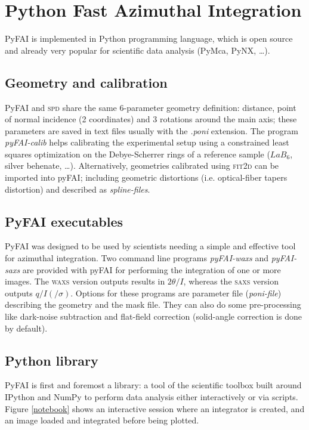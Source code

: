 \documentclass[a4paper]{jpconf}
\begin{document}
\section{Python Fast Azimuthal Integration}
PyFAI is implemented in Python programming language, which is open
source and already very popular for scientific data analysis (PyMca\cite{pymca},
PyNX\cite{pynx}, \ldots). 

\subsection{Geometry and calibration}
PyFAI and \textsc{spd}\cite{spd} share the same 6-parameter geometry definition:
distance, point of normal incidence (2 coordinates) and 3 rotations around
the main axis; these parameters are saved in text files usually with the
\textit{.poni} extension. The program \textit{pyFAI-calib} helps calibrating the
experimental setup using a constrained least squares optimization on the
Debye-Scherrer rings of a reference sample ($LaB_6$, silver
behenate, \ldots). Alternatively, geometries calibrated using 
\textsc{fit2d}\cite{fit2d1996} can be imported into pyFAI; including geometric
distortions (i.e. optical-fiber tapers distortion) and described as
\textit{spline-files}.

\subsection{PyFAI executables}
PyFAI was designed to be used by scientists needing a simple and effective tool
for azimuthal integration. Two command line programs \textit{pyFAI-waxs} and
\textit{pyFAI-saxs} are provided with pyFAI for performing the
integration of one or more images. The \textsc{waxs} version outputs results in
$2\theta /I$,  whereas the \textsc{saxs} version outputs $q/I(/\sigma )$.
Options for these programs are parameter file (\textit{poni-file}) describing
the geometry and the mask file. They can also do some pre-processing like
dark-noise subtraction and flat-field correction (solid-angle correction is done by
default).

\subsection{Python library}
PyFAI is first and foremost a library: a tool of the scientific
toolbox built around IPython\cite{ipython} and NumPy\cite{numpy} to
perform data analysis either interactively or via scripts.
Figure \ref{notebook} shows an interactive session where an integrator is
created, and an image loaded and integrated before being plotted.
\end{document}
